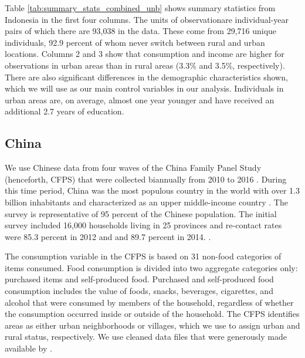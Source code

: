\documentclass[12pt]{article}
\begin{document}
Table \ref{tab:summary_stats_combined_unb} shows summary statistics from Indonesia in the first four columns. The units of observationare individual-year pairs of which there are 93,038 in the data. These come from 29,716 unique individuals, 92.9 percent of whom never switch between rural and urban locations. 
Columns 2 and 3 show that consumption and income are higher for observations in urban areas than in rural areas (3.3\% and 3.5\%, respectively). There are also significant differences in the demographic characteristics shown, which we will use as our main control variables in our analysis. Individuals in urban areas are, on average, almost one year younger and have received an additional 2.7 years of education.





\subsection{China}\label{subsec:China-data}
We use Chinese data from four waves of the China Family Panel Study (henceforth, CFPS) that  were collected biannually from 2010 to 2016 \citep{ISSS2015}. During this time period, China was the most populous country in the world with over 1.3 billion inhabitants and characterized as an upper middle-income country \citep{worldbank2024wdi}.
The survey is representative of 95 percent of the Chinese population. The initial survey included 16,000 households living in 25 provinces and re-contact rates were 85.3 percent in 2012 and and 89.7 percent in 2014.
 \citep{lagakosMigrationCostsObservational2020}.

The consumption variable in the CFPS is based on 31 non-food categories of items consumed. Food consumption is divided into two aggregate categories only: purchased items and self-produced food. Purchased and self-produced food consumption includes the value of foods, snacks, beverages, cigarettes, and alcohol that were consumed by members of the household, regardless of whether the consumption occurred inside or outside of the household. 
The CFPS identifies areas as either urban neighborhoods or villages, which we use to assign urban and rural status, respectively. 
We use cleaned data files that were generously made available by \cite{lagakosMigrationCostsObservational2020}.
\end{document}
